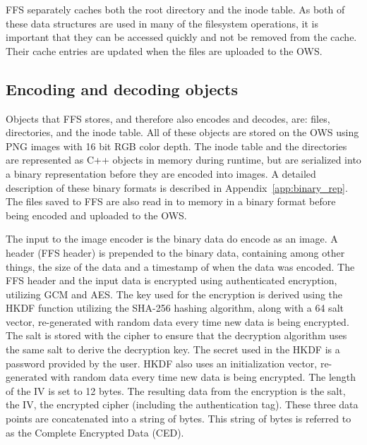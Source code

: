FFS separately caches both the root directory and the inode table. As both of these data structures are used in many of the filesystem operations, it is important that they can be accessed quickly and not be removed from the cache. Their cache entries are updated when the files are uploaded to the OWS.

\subsection{Encoding and decoding objects}
\label{subsec:file_enc_dec}
Objects that FFS stores, and therefore also encodes and decodes, are: files, directories, and the inode table. All of these objects are stored on the OWS using PNG images with 16 bit RGB color depth. The inode table and the directories are represented as C++ objects in memory during runtime, but are serialized into a binary representation before they are encoded into images. A detailed description of these binary formats is described in Appendix~\ref{app:binary_rep}. The files saved to FFS are also read in to memory in a binary format before being encoded and uploaded to the OWS. 

The input to the image encoder is the binary data do encode as an image. A header (FFS header) is prepended to the binary data, containing among other things, the size of the data and a timestamp of when the data was encoded. The FFS header and the input data is encrypted using authenticated encryption, utilizing GCM and AES. The key used for the encryption is derived using the HKDF function utilizing the SHA-256 hashing algorithm, along with a \SI{64}{\byte} salt vector, re-generated with random data every time new data is being encrypted. The salt is stored with the cipher to ensure that the decryption algorithm uses the same salt to derive the decryption key. The secret used in the HKDF is a password provided by the user. HKDF also uses an initialization vector, re-generated with random data every time new data is being encrypted. The length of the IV is set to 12 bytes. The resulting data from the encryption is the salt, the IV, the encrypted cipher (including the authentication tag). These three data points are concatenated into a string of bytes. This string of bytes is referred to as the Complete Encrypted Data (\gls{CED}).


